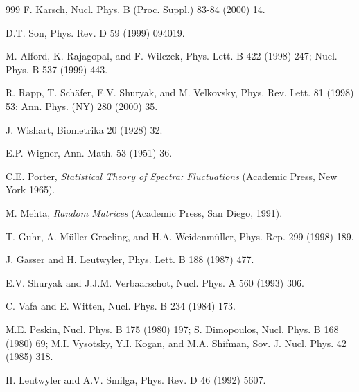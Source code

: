 \begin{thebibliography}{999}
      F. Karsch, 
                      Nucl. Phys. B (Proc. Suppl.) 83-84 (2000) 14.

         D.T. Son, 
                      Phys. Rev. D 59 (1999) 094019.     %

     M. Alford, K. Rajagopal, and F. Wilczek,
                      Phys. Lett. B 422 (1998) 247;      %
                      Nucl. Phys. B 537 (1999) 443.      %

 R. Rapp, T. Sch\"afer, E.V. Shuryak, and M. Velkovsky,
                      Phys. Rev. Lett. 81 (1998) 53;     %
                      Ann. Phys. (NY) 280 (2000) 35.

      J. Wishart, 
                      Biometrika 20 (1928) 32.           %

      E.P. Wigner, 
                      Ann. Math. 53 (1951) 36.           %

      C.E. Porter, 
                      {\it Statistical Theory of Spectra: Fluctuations}
                      (Academic Press, New York 1965).   %

       M. Mehta, 
                      {\it Random Matrices}
                      (Academic Press, San Diego, 1991). %

      T. Guhr, A. M\"uller-Groeling, and H.A. Weidenm\"uller, 
                      Phys. Rep. 299 (1998) 189.         %

          J. Gasser and H. Leutwyler, 
                      Phys. Lett. B 188 (1987) 477.      %

      E.V. Shuryak and J.J.M. Verbaarschot, 
                      Nucl. Phys. A 560 (1993) 306.      %

      C. Vafa and E. Witten, 
                      Nucl. Phys. B 234 (1984) 173.      %

      M.E. Peskin, 
                      Nucl. Phys. B 175 (1980) 197;      %
                      S. Dimopoulos, 
                      Nucl. Phys. B 168 (1980) 69;       %
                      M.I. Vysotsky, Y.I. Kogan, and M.A. Shifman,
                      Sov. J. Nucl. Phys. 42 (1985) 318. %

      H. Leutwyler and A.V. Smilga, 
                      Phys. Rev. D 46 (1992) 5607.       %


\end{thebibliography}
